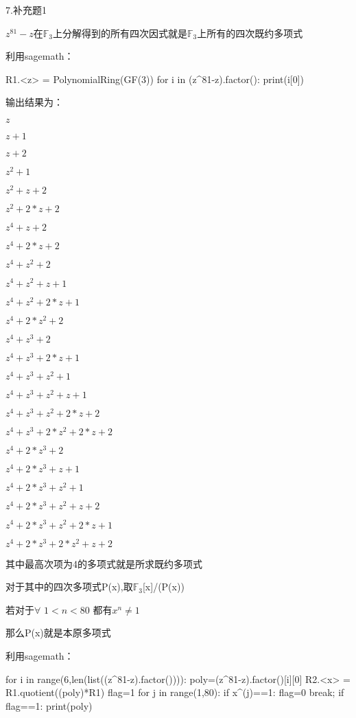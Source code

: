 \documentclass{ctexart}
\begin{document}
   	7.补充题1
   	
   	$z^{81}-z$在$\mathbb{F}$$_{3}$上分解得到的所有四次因式就是$\mathbb{F}$$_{3}$上所有的四次既约多项式
   	
   	利用sagemath：
   	
   	\begin{python}
   		R1.<z> = PolynomialRing(GF(3))
   		for i in (z^81-z).factor():
   			print(i[0])
   	\end{python}
   
   输出结果为：
   
   $z$
   
   $z + 1$
   
   $z + 2$
   
   $z^2 + 1$
   
   $z^2 + z + 2$
   
   $z^2 + 2*z + 2$
   
   $z^4 + z + 2$
   
   $z^4 + 2*z + 2$
   
   $z^4 + z^2 + 2$
   
   $z^4 + z^2 + z + 1$
   
   $z^4 + z^2 + 2*z + 1$
   
   $z^4 + 2*z^2 + 2$
   
   $z^4 + z^3 + 2$
   
   $z^4 + z^3 + 2*z + 1$
   
   $z^4 + z^3 + z^2 + 1$
   
   $z^4 + z^3 + z^2 + z + 1$
   
   $z^4 + z^3 + z^2 + 2*z + 2$
   
   $z^4 + z^3 + 2*z^2 + 2*z + 2$
   
   $z^4 + 2*z^3 + 2$
   
   $z^4 + 2*z^3 + z + 1$
   
   $z^4 + 2*z^3 + z^2 + 1$
   
   $z^4 + 2*z^3 + z^2 + z + 2$
   
   $z^4 + 2*z^3 + z^2 + 2*z + 1$
   
   $z^4 + 2*z^3 + 2*z^2 + z + 2$
   
   其中最高次项为4的多项式就是所求既约多项式
   
   对于其中的四次多项式P(x),取$\mathbb{F}$$_{3}$[x]/(P(x))
   
   若对于$\forall$ $1<n<80$ 都有$x^n\neq1$
   
   那么P(x)就是本原多项式
   
   利用sagemath：

	\begin{python}
   for i in range(6,len(list((z^81-z).factor()))):
   		poly=(z^81-z).factor()[i][0]
   		R2.<x> = R1.quotient((poly)*R1)
   		flag=1
   		for j in range(1,80):
   			if x^(j)==1:
   			flag=0
   			break;
   		if flag==1:
   			print(poly)
	\end{python}
   
\end{document}
